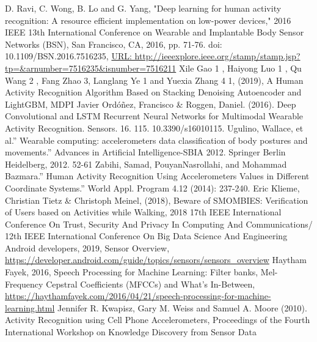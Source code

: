 \documentclass[10pt,halfline,a4paper]{ouparticle}
\begin{document}
\begin{thebibliography}{999}
	D. Ravi, C. Wong, B. Lo and G. Yang, "Deep learning for human activity recognition: A resource efficient implementation on low-power devices," 2016 IEEE 13th International Conference on Wearable and Implantable Body Sensor Networks (BSN), San Francisco, CA, 2016, pp. 71-76.
	doi: 10.1109/BSN.2016.7516235,
	\url{URL: http://ieeexplore.ieee.org/stamp/stamp.jsp?tp=\&arnumber=7516235\&isnumber=7516211}
	Xile Gao 1 , Haiyong Luo 1 , Qu Wang 2 , Fang Zhao 3, Langlang Ye 1 and Yuexia Zhang 4
	1, (2019), A Human Activity Recognition Algorithm Based on Stacking Denoising Autoencoder and LightGBM, MDPI
	Javier Ordóñez, Francisco \& Roggen, Daniel. (2016). Deep Convolutional and LSTM Recurrent Neural Networks for Multimodal Wearable Activity Recognition. Sensors. 16. 115. 10.3390/s16010115. 
	Ugulino, Wallace, et al.” Wearable computing: accelerometers data classification of body postures and movements.” Advances in Artificial Intelligence-SBIA 2012. Springer Berlin Heidelberg, 2012. 52-61
	Zabihi, Samad, PouyanNasrollahi, and Mohammad Bazmara.” Human Activity Recognition Using Accelerometers Values in Different Coordinate Systems.” World Appl. Program 4.12 (2014): 237-240.
	Eric Klieme, Christian Tietz \& Christoph Meinel, (2018), Beware of SMOMBIES: Verification of Users based on Activities while Walking, 2018 17th IEEE International Conference On Trust, Security And Privacy In Computing And Communications/ 12th IEEE International Conference On Big Data Science And Engineering
	Android developers, 2019, Sensor Overview, \url{https://developer.android.com/guide/topics/sensors/sensors_overview}
	Haytham Fayek, 2016, Speech Processing for Machine Learning: Filter banks, Mel-Frequency Cepstral Coefficients (MFCCs) and What's In-Between, \url{https://haythamfayek.com/2016/04/21/speech-processing-for-machine-learning.html}
	Jennifer R. Kwapisz, Gary M. Weiss and Samuel A. Moore (2010). Activity Recognition using Cell Phone Accelerometers, Proceedings of the Fourth International Workshop on Knowledge Discovery from Sensor Data
\end{thebibliography}
\end{document}

